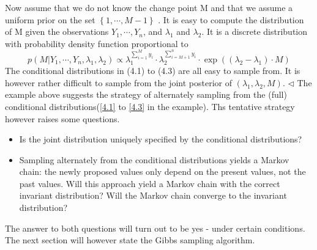 \documentclass[3pd]{elsarticle}
\begin{document}
Now assume that we do not know the change point M and that we assume a uniform prior on the set $\left\lbrace 1, \cdots, M - 1\right\rbrace$
. It is easy to compute the distribution of M given the observations $Y_1, \cdots, Y_n$, and $\lambda_1$ and $\lambda_2$.
It is a discrete distribution with probability density function proportional to 
\begin{equation}\label{4.3}
 p(M|Y_1, \cdots, Y_n, \lambda_1,\lambda_2) \varpropto \lambda_{1}^{\sum_{i=1}^{M} y_{i}} \cdot\lambda_{2}^{\sum_{i = M+1}^{n}y_{i}}
 \cdot \exp((\lambda_{2} - \lambda_{1}) \cdot M)
\end{equation}
The conditional distributions in (4.1) to (4.3) are all easy to sample from. It is however rather difficult to sample 
from the joint posterior of $\left( \lambda_1, \lambda_2, M\right)$. $\triangleleft$
The example above suggests the strategy of alternately sampling from the (full) conditional distributions(\ref{4.1} to 
\ref{4.3} in the example). Ths tentative strategy however raises some questions.
\begin{itemize} 
 \item Is the joint distribution uniquely specified by the conditional distributions?
 \item Sampling alternately from the conditional distributions yields a Markov chain: the newly proposed values only
 depend on the present values, not the past values. Will this approach yield a Markov chain with the correct
 invariant distribution? Will the Markov chain converge to the invariant distribution?
\end{itemize}
The answer to both questions will turn out to be yes - under certain conditions. The next section will however state
the Gibbs sampling algorithm. 
 
\end{document}
